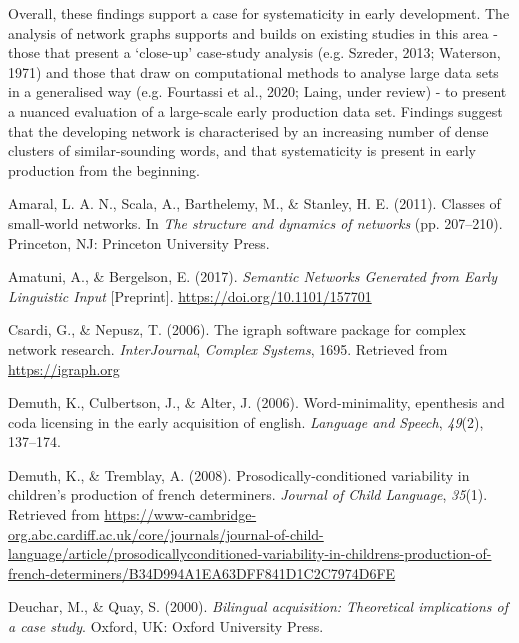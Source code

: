 \documentclass[
  man]{apa6}
\newlength{\cslhangindent}
\newlength{\cslentryspacingunit} %
\newenvironment{CSLReferences}[2] %
 {%
  \setlength{\parindent}{0pt}
  \ifodd #1
  \let\oldpar\par
  \def\par{\hangindent=\cslhangindent\oldpar}
  \fi
  \setlength{\parskip}{#2\cslentryspacingunit}
 }%
 {}
\begin{document}
Overall, these findings support a case for systematicity in early development. The analysis of network graphs supports and builds on existing studies in this area - those that present a `close-up' case-study analysis (e.g. Szreder, 2013; Waterson, 1971) and those that draw on computational methods to analyse large data sets in a generalised way (e.g. Fourtassi et al., 2020; Laing, under review) - to present a nuanced evaluation of a large-scale early production data set. Findings suggest that the developing network is characterised by an increasing number of dense clusters of similar-sounding words, and that systematicity is present in early production from the beginning.

\hypertarget{refs}{}
\begin{CSLReferences}{1}{0}
\leavevmode{}%
Amaral, L. A. N., Scala, A., Barthelemy, M., \& Stanley, H. E. (2011). Classes of small-world networks. In \emph{The structure and dynamics of networks} (pp. 207--210). Princeton, {NJ}: Princeton University Press.

\leavevmode{}%
Amatuni, A., \& Bergelson, E. (2017). \emph{Semantic {Networks} {Generated} from {Early} {Linguistic} {Input}} {[}Preprint{]}. \url{https://doi.org/10.1101/157701}

\leavevmode{}%
Csardi, G., \& Nepusz, T. (2006). The igraph software package for complex network research. \emph{InterJournal}, \emph{Complex Systems}, 1695. Retrieved from \url{https://igraph.org}

\leavevmode{}%
Demuth, K., Culbertson, J., \& Alter, J. (2006). Word-minimality, epenthesis and coda licensing in the early acquisition of english. \emph{Language and Speech}, \emph{49}(2), 137--174.

\leavevmode{}%
Demuth, K., \& Tremblay, A. (2008). Prosodically-conditioned variability in children's production of french determiners. \emph{Journal of Child Language}, \emph{35}(1). Retrieved from \url{https://www-cambridge-org.abc.cardiff.ac.uk/core/journals/journal-of-child-language/article/prosodicallyconditioned-variability-in-childrens-production-of-french-determiners/B34D994A1EA63DFF841D1C2C7974D6FE}

\leavevmode{}%
Deuchar, M., \& Quay, S. (2000). \emph{Bilingual acquisition: Theoretical implications of a case study}. Oxford, {UK}: Oxford University Press.


\end{CSLReferences}
\end{document}

